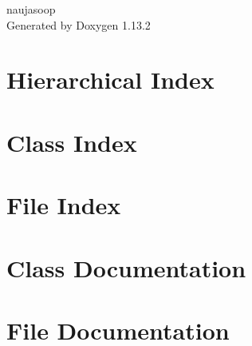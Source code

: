 \documentclass[twoside]{book}
\newcommand{\+}{\discretionary{\mbox{\scriptsize$\hookleftarrow$}}{}{}}
\newcommand{\clearemptydoublepage}{%
    \newpage{\pagestyle{empty}\cleardoublepage}%
  }
\begin{document}
  \raggedbottom
    \hypersetup{pageanchor=false,
                bookmarksnumbered=true,
                pdfencoding=unicode
               }
  \begin{titlepage}
  \vspace*{7cm}
  \begin{center}%
  {\Large naujasoop}\\
  \vspace*{1cm}
  {\large Generated by Doxygen 1.13.2}\\
  \end{center}
  \end{titlepage}
  \clearemptydoublepage
  \tableofcontents
  \clearemptydoublepage
  \hypersetup{pageanchor=true}

\chapter{Hierarchical Index}

\chapter{Class Index}

\chapter{File Index}

\chapter{Class Documentation}


\chapter{File Documentation}














  \backmatter
  \newpage
  \clearemptydoublepage
  \printindex
\end{document}
